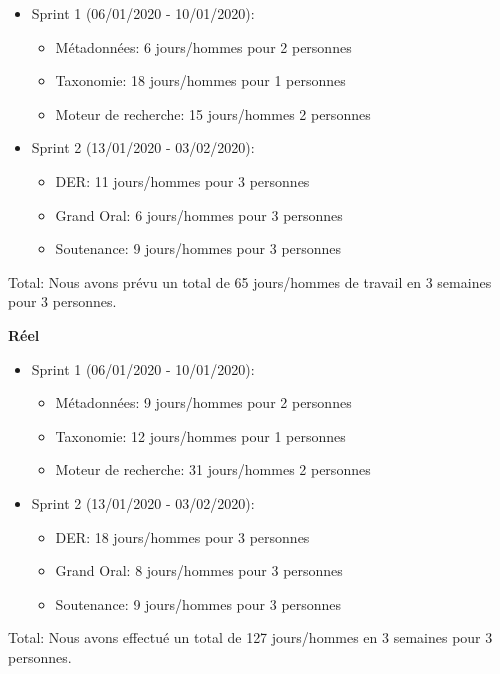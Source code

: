 \begin{itemize}
    \item Sprint 1 (06/01/2020 - 10/01/2020):
        \begin{itemize}
            \item Métadonnées: 6 jours/hommes pour 2 personnes
            \item Taxonomie: 18 jours/hommes pour 1 personnes
            \item Moteur de recherche: 15 jours/hommes 2 personnes
        \end{itemize}
    \item Sprint 2 (13/01/2020 - 03/02/2020):
    \begin{itemize}
        \item DER\@: 11 jours/hommes pour 3 personnes
        \item Grand Oral: 6 jours/hommes pour 3 personnes
        \item Soutenance:  9 jours/hommes pour 3 personnes
    \end{itemize}
\end{itemize} 

Total:  Nous avons prévu un total de 65 jours/hommes de travail en 3 semaines pour 3 personnes.


\textbf{Réel}

\begin{itemize}
    \item Sprint 1 (06/01/2020 - 10/01/2020):
        \begin{itemize}
            \item Métadonnées: 9 jours/hommes pour 2 personnes
            \item Taxonomie: 12 jours/hommes pour 1 personnes
            \item Moteur de recherche: 31 jours/hommes 2 personnes
        \end{itemize}
    \item Sprint 2 (13/01/2020 - 03/02/2020):
    \begin{itemize}
        \item DER\@: 18 jours/hommes pour 3 personnes
        \item Grand Oral: 8 jours/hommes pour 3 personnes
        \item Soutenance:  9 jours/hommes pour 3 personnes
    \end{itemize}
\end{itemize} 

Total:  Nous avons effectué un total de 127 jours/hommes en 3 semaines pour 3 personnes.

